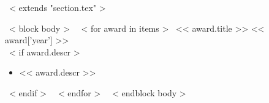 ~< extends "section.tex" >~

~< block body >~
  ~< for award in items >~
    << award.title >> \hfill << award['year'] >> \\
    ~< if award.descr >~
      \begin{itemize}
      \item << award.descr >>
      \end{itemize}
    ~< endif >~
  ~< endfor >~
\vspace{-.15in}
~< endblock body >~


